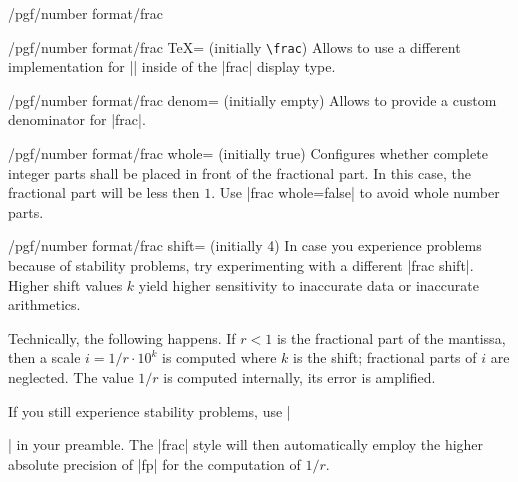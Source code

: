 \begin{key}{/pgf/number format/frac}
\begin{key}{/pgf/number format/frac TeX= (initially \texttt{\textbackslash frac})}
	Allows to use a different implementation for |\frac| inside of the |frac| display type.
\end{key}
\begin{key}{/pgf/number format/frac denom= (initially empty)}
	Allows to provide a custom denominator for |frac|.
\begin{codeexample}[width=3cm]
\hspace{1em}
\hspace{1em}
\hspace{1em}
\hspace{1em}
\hspace{1em}
\end{codeexample}
\end{key}
\begin{key}{/pgf/number format/frac whole= (initially true)}
	Configures whether complete integer parts shall be placed in front of the fractional part. In this case, the fractional part will be less then $1$. Use |frac whole=false| to avoid whole number parts.
\begin{codeexample}[width=3cm]
\hspace{1em}
\hspace{1em}
\hspace{1em}
\hspace{1em}
\hspace{1em}
\end{codeexample}
\end{key}
\begin{key}{/pgf/number format/frac shift= (initially 4)}
	In case you experience problems because of stability problems, try experimenting with a different |frac shift|. 
	Higher shift values $k$ yield higher sensitivity to inaccurate data or inaccurate arithmetics.

	Technically, the following happens. If $r < 1$ is the fractional part of the mantissa, then a scale $i = 1/r \cdot 10^k$ is computed where $k$ is the shift; fractional parts of $i$ are neglected. The value $1/r$ is computed internally, its error is amplified.

	If you still experience stability problems, use |\usepackage{fp}| in your preamble. The |frac| style will then automatically employ the higher absolute precision of |fp| for the computation of $1/r$.
\end{key}
\end{key}

